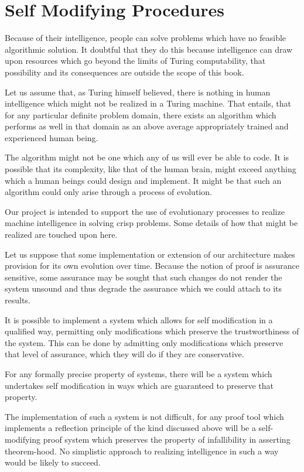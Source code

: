\section{Self Modifying Procedures}

Because of their intelligence, people can solve problems which have no
feasible algorithmic solution.
It doubtful that they do this because intelligence can draw upon
resources which go beyond the limits of Turing computability, that
possibility and its consequences are outside the scope of this book.

Let us assume that, as Turing himself believed, there is nothing in
human intelligence which might not be realized in a Turing machine.
That entails, that for any particular definite problem domain, there
exists an algorithm which performs as well in that domain as
an above average appropriately trained and experienced human being.

The algorithm might not be one which any of us will ever be able to
code.
It is possible that its complexity, like that of the human brain,
might exceed anything which a human beings could design and
implement.
It might be that such an algorithm could only arise through a process
of evolution.

Our project is intended to support the use of evolutionary processes
to realize machine intelligence in solving crisp problems.
Some details of how that might be realized are touched upon here.

Let us suppose that some implementation or extension of our
architecture makes provision for its own evolution over time.
Because the notion of proof is assurance sensitive, some assurance may
be sought that such changes do not render the system unsound and thus
degrade the assurance which we could attach to its results.

It is possible to implement a system which allows for self
modification in a qualified way, permitting only modifications which
preserve the trustworthiness of the system.
This can be done by admitting only modifications which preserve that
level of assurance, which they will do if they are conservative.

For any formally precise property of systems, there will be a system
which undertakes self modification in ways which are guaranteed to
preserve that property.

The implementation of such a system is not difficult, for any proof
tool which implements a reflection principle of the kind discussed
above will be a self-modifying proof system which preserves the
property of infallibility in asserting theorem-hood.
No simplistic approach to realizing intelligence in such a way would
be likely to succeed.







